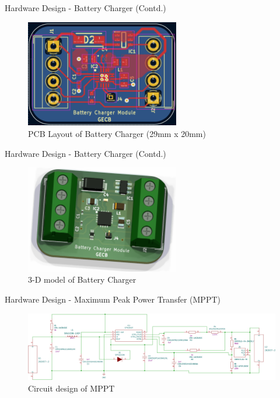 \documentclass[aspectratio=169]{beamer}
\begin{document}
		
		
		\begin{frame}{Hardware Design - Battery Charger (Contd.) }
			\begin{figure}[h]
				\centering
				\includegraphics[width=0.6\textwidth]{diag/charg pcb.png}
				\caption{PCB Layout of Battery Charger (29mm x 20mm)}
				\label{fig:mesh1}
			\end{figure}
		\end{frame}
		\begin{frame}{Hardware Design - Battery Charger (Contd.) }
			\begin{figure}[h]
				\centering
				\includegraphics[width=0.6\textwidth]{diag/charg 3d.png}
				\caption{3-D model of Battery Charger}
				\label{fig:mesh1}
			\end{figure}
		\end{frame}
		
		
		
		
		\begin{frame}{Hardware Design - Maximum Peak Power Transfer (MPPT) }
			\begin{figure}[h]
				\centering
				\includegraphics[width=1\textwidth]{diag/MpptDemoBoard.pdf}
				\caption{Circuit design of MPPT}
				\label{fig:mesh1}
			\end{figure}
		\end{frame}
		
\end{document}
